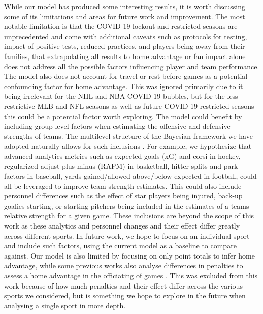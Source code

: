 While our model has produced some interesting results, it is worth discussing some of its limitations and areas for future work and improvement. The most notable limitation is that the COVID-19 lockout and restricted seasons are unprecedented and come with additional caveats such as protocols for testing, impact of positive tests, reduced practices, and players being away from their families, that extrapolating all results to home advantage or fan impact alone does not address all the possible factors influencing player and team performance. The model also does not account for travel or rest before games as a potential confounding factor for home advantage. This was ignored primarily due to it being irrelevant for the NHL and NBA COVID-19 bubbles, but for the less restrictive MLB and NFL seasons as well as future COVID-19 restricted seasons this could be a potential factor worth exploring. The model could benefit by including group level factors when estimating the offensive and defensive strengths of teams. The multilevel structure of the Bayesian framework we have adopted naturally allows for such inclusions \cite{Gelman2006} \cite{Gelman2014} \cite{McElreath2020}. For example, we hypothesize that advanced analytics metrics such as expected goals (xG) and corsi in hockey, regularized adjust plus-minus (RAPM) in basketball, hitter splits and park factors in baseball, yards gained/allowed above/below expected in football, could all be leveraged to improve team strength estimates. This could also include personnel differences such as the effect of star players being injured, back-up goalies starting, or starting pitchers being included in the estimates of a teams relative strength for a given game. These inclusions are beyond the scope of this work as these analytics and personnel changes and their effect differ greatly across different sports. In future work, we hope to focus on an individual sport and include such factors, using the current model as a baseline to compare against. Our model is also limited by focusing on only point totals to infer home advantage, while some previous works also analyse differences in penalties to assess a home advantage in the officiating of games \cite{Benz2020} \cite{Unkelbach2010} \cite{Buraimo2010} \cite{Dohmen2016}. This was excluded from this work because of how much penalties and their effect differ across the various sports we considered, but is something we hope to explore in the future when analysing a single sport in more depth.